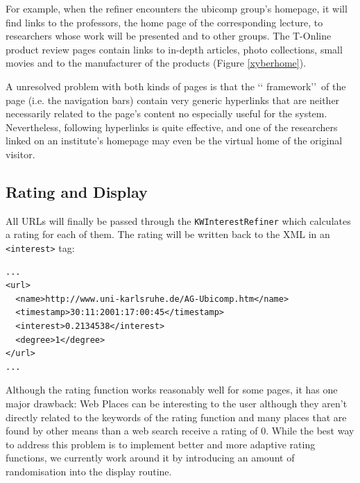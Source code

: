 \documentclass[a4paper]{danarticle}
\theoremstyle{remark}
\begin{document}
      For example, when the refiner encounters the ubicomp group's homepage, it
      will find links to the professors, the home page of the corresponding
      lecture, to researchers whose work will be presented and to other groups.
      The T-Online product review pages contain links to in-depth articles,
      photo collections, small movies and to the manufacturer of the products
      (Figure \ref{xyberhome}).
      
      A unresolved problem with both kinds of pages is that the \lq\lq
      framework\rq\rq\ of the page (i.e. the navigation bars) contain very
      generic hyperlinks that are neither necessarily related to the page's content
      no especially useful for the system.
      Nevertheless, following hyperlinks is quite effective, and one of the
      researchers linked on an institute's homepage may even be the virtual home
      of the original visitor.
    \subsection{Rating and Display}
      All URLs will finally be passed through the \verb$KWInterestRefiner$
      which
      calculates a rating for each of them. The rating will be written back
      to the XML in an \verb$<interest>$ tag:
      
      \begin{verbatim}
...
<url>
  <name>http://www.uni-karlsruhe.de/AG-Ubicomp.htm</name> 
  <timestamp>30:11:2001:17:00:45</timestamp> 
  <interest>0.2134538</interest>
  <degree>1</degree> 
</url>
...
      \end{verbatim}
      
      Although the rating function works reasonably well for some pages, it has
      one major drawback: Web Places can be interesting to the user although
      they aren't directly related to the keywords of the rating function and
      many places that are found by other means than a web search receive
      a rating of 0. While the best way to address this problem is to implement
      better and more adaptive rating functions, we currently work around it by
      introducing an amount of randomisation into the display routine. 
 
\end{document}
